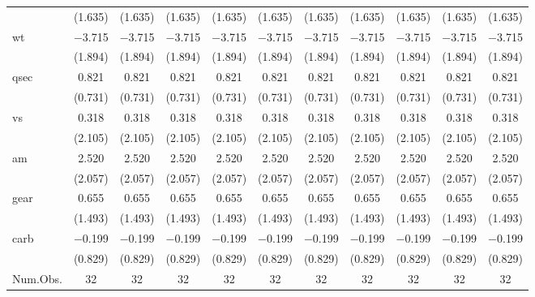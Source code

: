 \documentclass[
  12pt,
]{article}
\begin{document}
{\begin{landscape}
\begin{longtable}[t]{lcccccccccc}
 & (\num{1.635}) & (\num{1.635}) & (\num{1.635}) & (\num{1.635}) & (\num{1.635}) & (\num{1.635}) & (\num{1.635}) & (\num{1.635}) & (\num{1.635}) & (\num{1.635})\\
wt & \num{-3.715} & \num{-3.715} & \num{-3.715} & \num{-3.715} & \num{-3.715} & \num{-3.715} & \num{-3.715} & \num{-3.715} & \num{-3.715} & \num{-3.715}\\
 & (\num{1.894}) & (\num{1.894}) & (\num{1.894}) & (\num{1.894}) & (\num{1.894}) & (\num{1.894}) & (\num{1.894}) & (\num{1.894}) & (\num{1.894}) & (\num{1.894})\\
qsec & \num{0.821} & \num{0.821} & \num{0.821} & \num{0.821} & \num{0.821} & \num{0.821} & \num{0.821} & \num{0.821} & \num{0.821} & \num{0.821}\\
 & (\num{0.731}) & (\num{0.731}) & (\num{0.731}) & (\num{0.731}) & (\num{0.731}) & (\num{0.731}) & (\num{0.731}) & (\num{0.731}) & (\num{0.731}) & (\num{0.731})\\
vs & \num{0.318} & \num{0.318} & \num{0.318} & \num{0.318} & \num{0.318} & \num{0.318} & \num{0.318} & \num{0.318} & \num{0.318} & \num{0.318}\\
 & (\num{2.105}) & (\num{2.105}) & (\num{2.105}) & (\num{2.105}) & (\num{2.105}) & (\num{2.105}) & (\num{2.105}) & (\num{2.105}) & (\num{2.105}) & (\num{2.105})\\
am & \num{2.520} & \num{2.520} & \num{2.520} & \num{2.520} & \num{2.520} & \num{2.520} & \num{2.520} & \num{2.520} & \num{2.520} & \num{2.520}\\
 & (\num{2.057}) & (\num{2.057}) & (\num{2.057}) & (\num{2.057}) & (\num{2.057}) & (\num{2.057}) & (\num{2.057}) & (\num{2.057}) & (\num{2.057}) & (\num{2.057})\\
gear & \num{0.655} & \num{0.655} & \num{0.655} & \num{0.655} & \num{0.655} & \num{0.655} & \num{0.655} & \num{0.655} & \num{0.655} & \num{0.655}\\
 & (\num{1.493}) & (\num{1.493}) & (\num{1.493}) & (\num{1.493}) & (\num{1.493}) & (\num{1.493}) & (\num{1.493}) & (\num{1.493}) & (\num{1.493}) & (\num{1.493})\\
carb & \num{-0.199} & \num{-0.199} & \num{-0.199} & \num{-0.199} & \num{-0.199} & \num{-0.199} & \num{-0.199} & \num{-0.199} & \num{-0.199} & \num{-0.199}\\
 & (\num{0.829}) & (\num{0.829}) & (\num{0.829}) & (\num{0.829}) & (\num{0.829}) & (\num{0.829}) & (\num{0.829}) & (\num{0.829}) & (\num{0.829}) & (\num{0.829})\\
\midrule
Num.Obs. & \num{32} & \num{32} & \num{32} & \num{32} & \num{32} & \num{32} & \num{32} & \num{32} & \num{32} & \num{32}\\

\end{longtable}
\end{landscape}}
\end{document}
